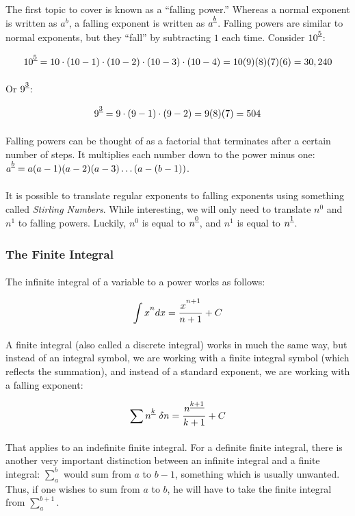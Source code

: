 \documentclass[12pt]{article}
\newcommand{\p}{\paragraph{}}
\newcommand{\fall}[1]{\strut^{\underline{#1}}}
\begin{document}
				\p The first topic to cover is known as a ``falling power.'' Whereas a normal exponent is written as $a^b$, a falling exponent is written as $a\fall{b}$. Falling powers are similar to normal exponents, but they ``fall'' by subtracting $1$ each time. Consider $10\fall{5}$:
				
				\begin{equation*}
					10\fall{5} = 10 \cdot (10-1) \cdot (10-2) \cdot (10-3) \cdot (10-4) = 10(9)(8)(7)(6) = 30,240
				\end{equation*}
				
				\p Or $9\fall{3}$:
				
				\begin{equation*}
					9\fall{3} = 9 \cdot (9-1) \cdot (9-2) = 9(8)(7) = 504
				\end{equation*}
				
				\p Falling powers can be thought of as a factorial that terminates after a certain number of steps. It multiplies each number down to the power minus one: $a\fall{b} = a(a-1)(a-2)(a-3)\dots(a-(b-1))$.
				
				\p It is possible to translate regular exponents to falling exponents using something called \emph{Stirling Numbers}. While interesting, we will only need to translate $n^0$ and $n^1$ to falling powers. Luckily, $n^0$ is equal to $n\fall{0}$, and $n^1$ is equal to $n\fall{1}$.
				
			\subsubsection{The Finite Integral}
			
				\p The infinite integral of a variable to a power works as follows:
				
				\begin{equation*}
					\int x\strut^n dx = \frac{x\strut^{n+1}}{n+1}+C
				\end{equation*}
				
				\p A finite integral (also called a discrete integral) works in much the same way, but instead of an integral symbol, we are working with a finite integral symbol (which reflects the summation), and instead of a standard exponent, we are working with a falling exponent:
				
				\begin{equation*}
					\sum n\fall{k}\ \delta n = \frac{n\fall{k+1}}{k+1} + C
				\end{equation*}
				
				\p That applies to an indefinite finite integral. For a definite finite integral, there is another very important distinction between an infinite integral and a finite integral: $\sum\limits_a^b$ would sum from $a$ to $b-1$, something which is usually unwanted. Thus, if one wishes to sum from $a$ to $b$, he will have to take the finite integral from $\sum\limits_a^{b+1}$.
				
\end{document}
